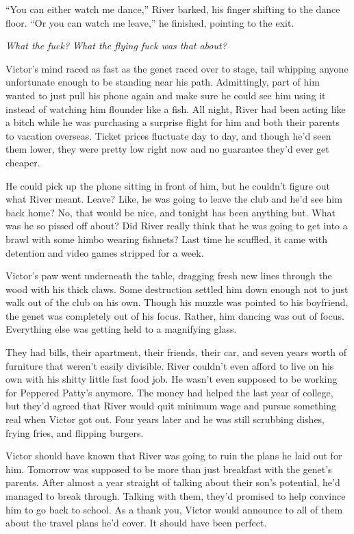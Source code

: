 ``You can either watch me dance,'' River barked, his finger shifting to
the dance floor. ``Or you can watch me leave,'' he finished, pointing to
the exit.

\emph{What the fuck? What the flying fuck was that about?}

Victor's mind raced as fast as the genet raced over to stage, tail
whipping anyone unfortunate enough to be standing near his path.
Admittingly, part of him wanted to just pull his phone again and make
sure he could see him using it instead of watching him flounder like a
fish. All night, River had been acting like a bitch while he was
purchasing a surprise flight for him and both their parents to vacation
overseas. Ticket prices fluctuate day to day, and though he'd seen them
lower, they were pretty low right now and no guarantee they'd ever get
cheaper.

He could pick up the phone sitting in front of him, but he couldn't
figure out what River meant. Leave? Like, he was going to leave the club
and he'd see him back home? No, that would be nice, and tonight has been
anything but. What was he so pissed off about? Did River really think
that he was going to get into a brawl with some himbo wearing fishnets?
Last time he scuffled, it came with detention and video games stripped
for a week.

Victor's paw went underneath the table, dragging fresh new lines through
the wood with his thick claws. Some destruction settled him down enough
not to just walk out of the club on his own. Though his muzzle was
pointed to his boyfriend, the genet was completely out of his focus.
Rather, him dancing was out of focus. Everything else was getting held
to a magnifying glass.

They had bills, their apartment, their friends, their car, and seven
years worth of furniture that weren't easily divisible. River couldn't
even afford to live on his own with his shitty little fast food job. He
wasn't even supposed to be working for Peppered Patty's anymore. The
money had helped the last year of college, but they'd agreed that River
would quit minimum wage and pursue something real when Victor got out.
Four years later and he was still scrubbing dishes, frying fries, and
flipping burgers.

Victor should have known that River was going to ruin the plans he laid
out for him. Tomorrow was supposed to be more than just breakfast with
the genet's parents. After almost a year straight of talking about their
son's potential, he'd managed to break through. Talking with them,
they'd promised to help convince him to go back to school. As a thank
you, Victor would announce to all of them about the travel plans he'd
cover. It should have been perfect.

